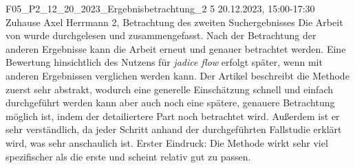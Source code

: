 \fieldnote
{F05\_P2\_12\_20\_2023\_Ergebnisbetrachtung\_2}
{5}
{20.12.2023, 15:00-17:30}
{Zuhause}
{Axel Herrmann}
{2, Betrachtung des zweiten Suchergebnisses}
{
	Die Arbeit von  wurde durchgelesen und zusammengefasst.
}
{
	Nach der Betrachtung der anderen Ergebnisse kann die Arbeit erneut und genauer betrachtet werden.
	Eine Bewertung hinsichtlich des Nutzens für \emph{jadice flow} erfolgt später, wenn mit anderen Ergebnissen verglichen werden kann.
}
{
	Der Artikel beschreibt die Methode zuerst sehr abstrakt, wodurch eine generelle Einschätzung schnell und einfach durchgeführt werden kann aber auch noch eine spätere, genauere Betrachtung möglich ist, indem der detailiertere Part noch betrachtet wird.
	Außerdem ist er sehr verständlich, da jeder Schritt anhand der durchgeführten Fallstudie erklärt wird, was sehr anschaulich ist.
}
{}
{
	Erster Eindruck: Die Methode wirkt sehr viel spezifischer als die erste und scheint relativ gut zu passen.
}
